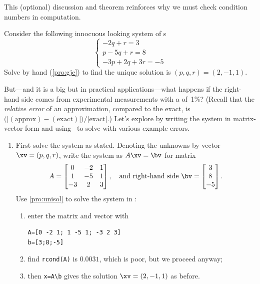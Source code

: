 This (optional) discussion and theorem reinforces why we must check condition numbers in computation.


\begin{example} \label{eg:ilsle}
Consider the following innocuous looking system of s
\begin{equation*}
\begin{cases}
-2q+r=3
\\p-5q+r=8
\\-3p+2q+3r=-5
\end{cases}
\end{equation*}
Solve by hand (\cref{pro:gje}) to find the unique solution is \((p,q,r)=(2,-1,1)\).

But---and it is a big but in practical applications---what happens if the right-hand side comes from experimental measurements with a  of~1\%? 
(Recall that the \emph{relative error} of an approximation, compared to the exact, is \(\big(|(\text{approx})-(\text{exact})|\big)/{|\text{exact}|}\).)
Let's explore by writing the system in matrix-vector form and using \script\ to solve with various example errors.
\begin{enumerate}
\item First solve the system as stated.  
Denoting the unknowns by vector \(\xv=(p,q,r)\), write the system as \(A\xv=\bv\) for matrix
\begin{equation*}
A=\begin{bmatrix} 0&-2&1
\\1&-5&1
\\-3&2&3 \end{bmatrix},
\quad\text{and right-hand side }
\bv=\begin{bmatrix} 3\\8\\-5 \end{bmatrix}.
\end{equation*}
Use \cref{pro:unisol} to solve the system in \script:
\begin{enumerate}
\item enter the matrix and vector with
\setbox\ajrqrbox\hbox{}%
\marginajrbox%
\begin{verbatim}
A=[0 -2 1; 1 -5 1; -3 2 3]
b=[3;8;-5]
\end{verbatim}
\item find \verb|rcond(A)| is \(0.0031\), which is poor, but we proceed anyway;
\item then \verb|x=A\b| gives the solution \(\xv=(2,-1,1)\) as before.
\end{enumerate}


\end{enumerate}
\end{example}
